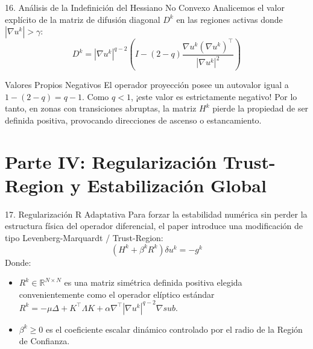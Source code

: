 \documentclass[aspectratio=169,11pt]{beamer}
\begin{document}
\begin{frame}{16. Análisis de la Indefinición del Hessiano No Convexo}
    Analicemos el valor explícito de la matriz de difusión diagonal $D^k$ en las regiones activas donde $|\nabla u^k| > \gamma$:
    \begin{equation}
        D^k = |\nabla u^k|^{q-2} \left( I - (2-q) \frac{\nabla u^k (\nabla u^k)^\top}{|\nabla u^k|^2} \right)
    \end{equation}
    \begin{alertblock}{Valores Propios Negativos}
        El operador proyección posee un autovalor igual a $1 - (2-q) = q - 1$. Como $q < 1$, ¡este valor es \alert{estrictamente negativo}! Por lo tanto, en zonas con transiciones abruptas, la matriz $H^k$ pierde la propiedad de ser definida positiva, provocando direcciones de ascenso o estancamiento.
    \end{alertblock}
\end{frame}

\section{Parte IV: Regularización Trust-Region y Estabilización Global}

\begin{frame}{17. Regularización R Adaptativa}
    Para forzar la estabilidad numérica sin perder la estructura física del operador diferencial, el paper introduce una modificación de tipo Levenberg-Marquardt / Trust-Region:
    \begin{equation}
        (H^k + \beta^k R^k) \delta u^k = -g^k
    \end{equation}
    Donde:
    \begin{itemize}
        \item $R^k \in \mathbb{R}^{N \times N}$ es una matriz simétrica definida positiva elegida convenientemente como el operador elíptico estándar $R^k = -\mu \Delta + K^\top \Lambda K + \alpha \nabla^\top |\nabla u^k|^{q-2} \nabla sub$.
        \item $\beta^k \ge 0$ es el coeficiente escalar dinámico controlado por el radio de la Región de Confianza.
    \end{itemize}
\end{frame}
\end{document}
